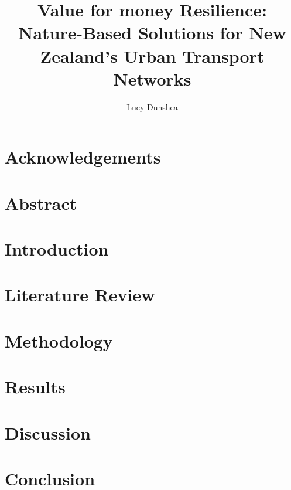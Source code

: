 \documentclass[12pt,a4paper, doc]{apa7}
\title{Value for money Resilience: Nature-Based Solutions for New Zealand’s Urban Transport Networks}
\author{Lucy Dunshea}
\affiliation{University of Canterbury}
\begin{document}
\maketitle
\newpage

\section{Acknowledgements}
\section{Abstract}

\newpage
\tableofcontents
\newpage
\section{Introduction}

\section{Literature Review}

\section{Methodology}

\section{Results}

\section{Discussion}

\section{Conclusion}

\newpage
\printbibliography{}
\end{document}
